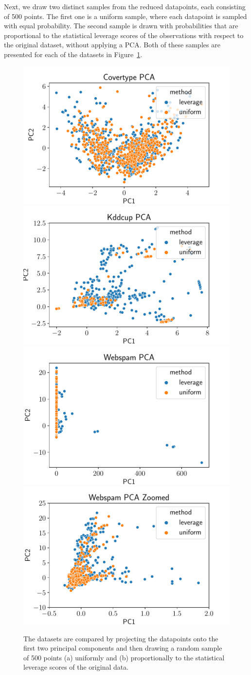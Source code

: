 Next, we draw two distinct samples from the reduced datapoints,
each consisting of 500 points. The first one is a uniform sample,
where each datapoint is sampled with equal probability.
The second sample is drawn with probabilities that are proportional
to the statistical leverage scores of the observations with
respect to the original dataset, without applying a PCA.
Both of these samples are presented for each of the datasets in
Figure~\ref{fig:dataset-comparison}.

\begin{figure}[ht!]
    \centering
    \includegraphics[width=.49\linewidth]{figures/covertype_pca.pdf}
    \includegraphics[width=.49\linewidth]{figures/kddcup_pca.pdf}
    \includegraphics[width=.49\linewidth]{figures/webspam_pca.pdf}
    \includegraphics[width=.49\linewidth]{figures/webspam_pca_zoomed.pdf}
    \caption{The datasets are compared by projecting the datapoints
        onto the first two principal components and then drawing
        a random sample of 500 points (a) uniformly and (b) proportionally to the
        statistical leverage scores of the original data.}
    \label{fig:dataset-comparison}
\end{figure}

